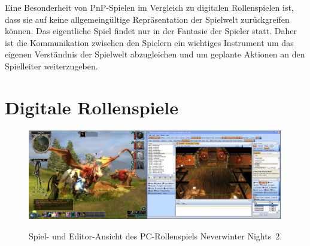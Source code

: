 Eine Besonderheit von PnP-Spielen im Vergleich zu digitalen Rollenspielen ist, dass sie auf keine allgemeingültige Repräsentation der Spielwelt zurückgreifen können. Das eigentliche Spiel findet nur in der Fantasie der Spieler statt. Daher ist die Kommunikation zwischen den Spielern ein wichtiges Instrument um das eigenen Verständnis der Spielwelt abzugleichen und um geplante Aktionen an den Spielleiter weiterzugeben. \cite{Drachen2008}

\section{Digitale Rollenspiele}
\label{sec:DigitaleRollenspiele}
%

\begin{figure}[h]
	\centering
	\includegraphics[width=0.465\textwidth]{media/NeverwinterNights2-game}\hspace{0.008\textwidth}\includegraphics[width=0.527\textwidth]{media/NeverwinterNights2-editor}
	\caption{Spiel\protect\footnotemark[2]- und Editor\protect\footnotemark[3]-Ansicht des PC-Rollenspiels Neverwinter Nights~2.}
\end{figure}


